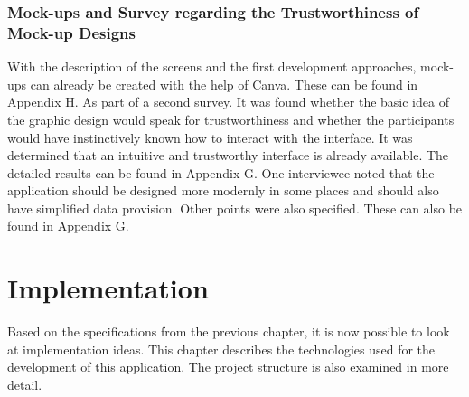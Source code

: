 \subsection{Mock-ups and Survey regarding the Trustworthiness of Mock-up Designs}
With the description of the screens and the first development approaches, mock-ups can already be created with the help of Canva. These can be found in Appendix H. As part of a second survey. It was found whether the basic idea of the graphic design would speak for trustworthiness and whether the participants would have instinctively known how to interact with the interface. It was determined that an intuitive and trustworthy interface is already available. The detailed results can be found in Appendix G. One interviewee noted that the application should be designed more modernly in some places and should also have simplified data provision. Other points were also specified. These can also be found in Appendix G.

\chapter{Implementation}
Based on the specifications from the previous chapter, it is now possible to look at implementation ideas. This chapter describes the technologies used for the development of this application. The project structure is also examined in more detail.

